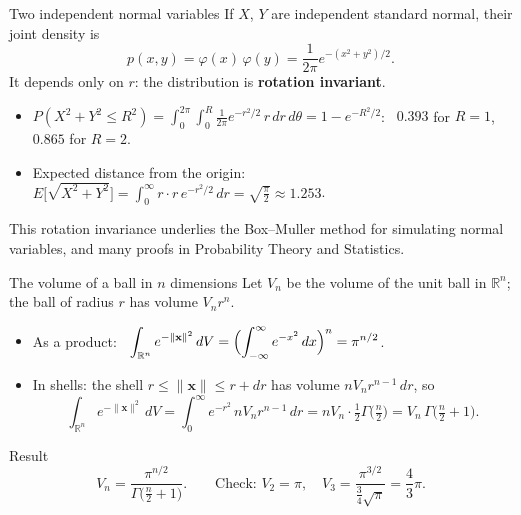 \documentclass[10pt]{wosm-slides}
\newcommand{\R}{\mathbb{R}}
\newcommand{\dV}{\, dV}
\newcommand{\norm}[1]{\lVert #1 \rVert}
\newcommand{\vx}{\mathbf{x}}
\begin{document}
\begin{frame}{Two independent normal variables}
  If $X$, $Y$ are independent standard normal, their joint density is
  \[ p(x, y) = \varphi(x)\,\varphi(y) = \frac{1}{2\pi} e^{-(x^2 + y^2)/2} . \]
  It depends only on $r$: the distribution is \textbf{rotation invariant}.
  \pause
  \begin{itemize}
    \item $\displaystyle P(X^2 + Y^2 \le R^2) = \int_0^{2\pi} \int_0^R \frac{1}{2\pi} e^{-r^2/2}\, r\, dr\, d\theta = 1 - e^{-R^2/2}$:
      \ $0.393$ for $R = 1$, \ $0.865$ for $R = 2$.
    \pause
    \item Expected distance from the origin:
      $\displaystyle E\bigl[\sqrt{X^2 + Y^2}\bigr] = \int_0^\infty r \cdot r\, e^{-r^2/2}\, dr = \sqrt{\frac\pi2} \approx 1.253$.
  \end{itemize}
  \pause
  {\small This rotation invariance underlies the Box--Muller method for simulating normal variables,
  and many proofs in Probability Theory and Statistics.\par}
\end{frame}

\begin{frame}{The volume of a ball in $n$ dimensions}
  Let $V_n$ be the volume of the unit ball in $\R^n$; the ball of radius $r$ has volume $V_n r^n$.
  \pause
  \begin{itemize}
    \item As a product: \ $\displaystyle \int_{\R^n} e^{-\norm{\vx}^2} \dV = \Bigl(\int_{-\infty}^\infty e^{-x^2}\, dx\Bigr)^n = \pi^{n/2}$.
    \pause
    \item In shells: the shell $r \le \norm{\vx} \le r + dr$ has volume $n V_n r^{n-1}\, dr$, so
      \[ \int_{\R^n} e^{-\norm{\vx}^2} \dV = \int_0^\infty e^{-r^2}\, n V_n r^{n-1}\, dr
         = n V_n \cdot \tfrac12 \Gamma\bigl(\tfrac n2\bigr) = V_n\, \Gamma\bigl(\tfrac n2 + 1\bigr) . \]
  \end{itemize}
  \pause
  \begin{block}{Result}
    \[ V_n = \frac{\pi^{n/2}}{\Gamma\bigl(\frac n2 + 1\bigr)} . \qquad
       \text{Check: } V_2 = \pi, \quad V_3 = \frac{\pi^{3/2}}{\frac34\sqrt\pi} = \frac43\pi . \]
  \end{block}
\end{frame}
\end{document}
